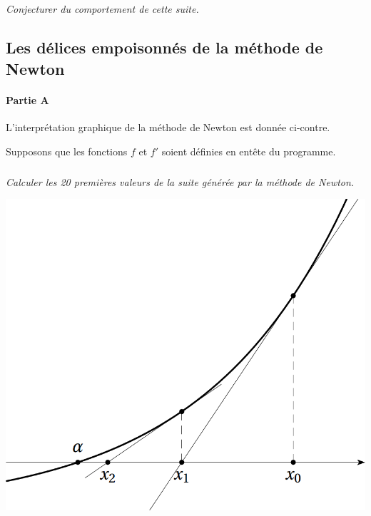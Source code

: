 \begin{multicols}{2}
\subparagraph{} \textit{Conjecturer du comportement de cette suite.}


\newpage

\setcounter{exo}{0}

\subsection*{Les délices empoisonnés de la méthode de Newton}

\paragraph*{Partie A}

L'interprétation graphique de la méthode de Newton est donnée ci-contre.

Supposons que les fonctions $f$ et $f'$ soient définies en entête du programme.

\subparagraph{}\textit{Calculer les 20 premières valeurs de la suite générée par la méthode de Newton.}
%
%
%
%
%
\begin{center}
\includegraphics[width=\linewidth]{images/fig1}
\end{center}


\end{multicols}
